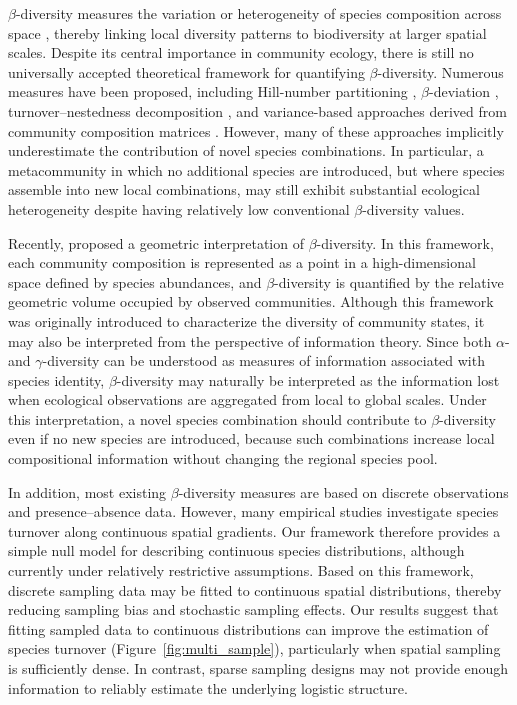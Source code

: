 $\beta$-diversity measures the variation or heterogeneity of species composition across space \citep{whittaker_vegetation_1960,anderson_navigating_2011}, thereby linking local diversity patterns to biodiversity at larger spatial scales. Despite its central importance in community ecology, there is still no universally accepted theoretical framework for quantifying $\beta$-diversity. Numerous measures have been proposed, including Hill-number partitioning \citep{jost_partitioning_2007}, $\beta$-deviation \citep{kraft_disentangling_2011}, turnover--nestedness decomposition \citep{baselga_relationship_2012}, and variance-based approaches derived from community composition matrices \citep{legendre_beta_2013}. However, many of these approaches implicitly underestimate the contribution of novel species combinations. In particular, a metacommunity in which no additional species are introduced, but where species assemble into new local combinations, may still exhibit substantial ecological heterogeneity despite having relatively low conventional $\beta$-diversity values.

Recently, \citet{song_geometric_2025} proposed a geometric interpretation of $\beta$-diversity. In this framework, each community composition is represented as a point in a high-dimensional space defined by species abundances, and $\beta$-diversity is quantified by the relative geometric volume occupied by observed communities. Although this framework was originally introduced to characterize the diversity of community states, it may also be interpreted from the perspective of information theory. Since both $\alpha$- and $\gamma$-diversity can be understood as measures of information associated with species identity, $\beta$-diversity may naturally be interpreted as the information lost when ecological observations are aggregated from local to global scales. Under this interpretation, a novel species combination should contribute to $\beta$-diversity even if no new species are introduced, because such combinations increase local compositional information without changing the regional species pool.

In addition, most existing $\beta$-diversity measures are based on discrete observations and presence--absence data. However, many empirical studies investigate species turnover along continuous spatial gradients. Our framework therefore provides a simple null model for describing continuous species distributions, although currently under relatively restrictive assumptions. Based on this framework, discrete sampling data may be fitted to continuous spatial distributions, thereby reducing sampling bias and stochastic sampling effects. Our results suggest that fitting sampled data to continuous distributions can improve the estimation of species turnover (Figure~\ref{fig:multi_sample}), particularly when spatial sampling is sufficiently dense. In contrast, sparse sampling designs may not provide enough information to reliably estimate the underlying logistic structure.

